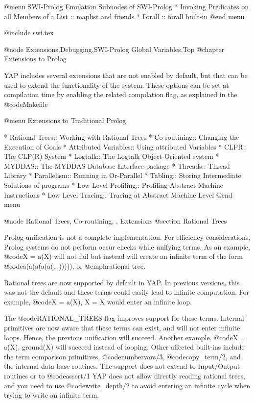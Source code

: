{{{{{{{{@menu SWI-Prolog Emulation
Subnodes of SWI-Prolog
* Invoking Predicates on all Members of a List :: maplist and friends
* Forall :: forall built-in
@end menu

@include swi.tex

@node Extensions,Debugging,SWI-Prolog Global Variables,Top 
@chapter Extensions to Prolog

YAP includes several extensions that are not enabled by
default, but that can be used to extend the functionality of the
system. These options can be set at compilation time by enabling the
related compilation flag, as explained in the @code{Makefile}

@menu
Extensions to Traditional Prolog

* Rational Trees:: Working with Rational Trees
* Co-routining:: Changing the Execution of Goals
* Attributed Variables:: Using attributed Variables
* CLPR:: The CLP(R) System
* Logtalk:: The Logtalk Object-Oriented system
* MYDDAS:: The MYDDAS Database Interface package
* Threads:: Thread Library
* Parallelism:: Running in Or-Parallel
* Tabling:: Storing Intermediate Solutions of programs 
* Low Level Profiling:: Profiling Abstract Machine Instructions
* Low Level Tracing:: Tracing at Abstract Machine Level
@end menu

@node Rational Trees, Co-routining, , Extensions
@section Rational Trees

Prolog unification is not a complete implementation. For efficiency
considerations, Prolog systems do not perform occur checks while
unifying terms. As an example, @code{X = a(X)} will not fail but instead
will create an infinite term of the form @code{a(a(a(a(a(...)))))}, or
@emph{rational tree}.

Rational trees are now supported by default in YAP. In previous
versions, this was not the default and these terms could easily lead
to infinite computation. For example, @code{X = a(X), X = X} would
enter an infinite loop.

The @code{RATIONAL_TREES} flag improves support for these
terms. Internal primitives are now aware that these terms can exist, and
will not enter infinite loops. Hence, the previous unification will
succeed. Another example, @code{X = a(X), ground(X)} will succeed
instead of looping. Other affected built-ins include the term comparison
primitives, @code{numbervars/3}, @code{copy_term/2}, and the internal
data base routines. The support does not extend to Input/Output routines
or to @code{assert/1} YAP does not allow directly reading
rational trees, and you need to use @code{write_depth/2} to avoid
entering an infinite cycle when trying to write an infinite term.

}}}}}}}}
